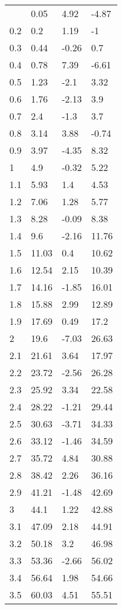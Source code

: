 \documentclass{article}
\begin{document}
\begin{center}
\begin{longtable}{|l|l|l|l|}
			\hline \hline
			\endlastfoot
			\centering
			0.1 & 0.05 & 4.92 & -4.87 \\ 
			0.2 & 0.2 & 1.19 & -1 \\ 
			0.3 & 0.44 & -0.26 & 0.7 \\ 
			0.4 & 0.78 & 7.39 & -6.61 \\ 
			0.5 & 1.23 & -2.1 & 3.32 \\ 
			0.6 & 1.76 & -2.13 & 3.9 \\ 
			0.7 & 2.4 & -1.3 & 3.7 \\ 
			0.8 & 3.14 & 3.88 & -0.74 \\ 
			0.9 & 3.97 & -4.35 & 8.32 \\ 
			1 & 4.9 & -0.32 & 5.22 \\ 
			1.1 & 5.93 & 1.4 & 4.53 \\ 
			1.2 & 7.06 & 1.28 & 5.77 \\ 
			1.3 & 8.28 & -0.09 & 8.38 \\ 
			1.4 & 9.6 & -2.16 & 11.76 \\ 
			1.5 & 11.03 & 0.4 & 10.62 \\ 
			1.6 & 12.54 & 2.15 & 10.39 \\ 
			1.7 & 14.16 & -1.85 & 16.01 \\ 
			1.8 & 15.88 & 2.99 & 12.89 \\ 
			1.9 & 17.69 & 0.49 & 17.2 \\ 
			2 & 19.6 & -7.03 & 26.63 \\ 
			2.1 & 21.61 & 3.64 & 17.97 \\ 
			2.2 & 23.72 & -2.56 & 26.28 \\ 
			2.3 & 25.92 & 3.34 & 22.58 \\ 
			2.4 & 28.22 & -1.21 & 29.44 \\ 
			2.5 & 30.63 & -3.71 & 34.33 \\ 
			2.6 & 33.12 & -1.46 & 34.59 \\ 
			2.7 & 35.72 & 4.84 & 30.88 \\ 
			2.8 & 38.42 & 2.26 & 36.16 \\ 
			2.9 & 41.21 & -1.48 & 42.69 \\ 
			3 & 44.1 & 1.22 & 42.88 \\ 
			3.1 & 47.09 & 2.18 & 44.91 \\ 
			3.2 & 50.18 & 3.2 & 46.98 \\ 
			3.3 & 53.36 & -2.66 & 56.02 \\ 
			3.4 & 56.64 & 1.98 & 54.66 \\ 
			3.5 & 60.03 & 4.51 & 55.51 \\ 

\end{longtable}
\end{center}
\end{document}
